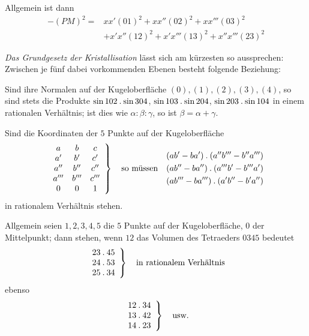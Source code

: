 Allgemein ist dann
\[
\begin{aligned}
-(PM)^2={}&xx'(01)^2+xx''(02)^2+xx'''(03)^2\\
&+x'x''(12)^2+x'x'''(13)^2+x''x'''(23)^2
\end{aligned}
\]

\emph{Das Grundgesetz der Kristallisation} lässt sich am kürzesten so aussprechen: Zwischen je fünf dabei vorkommenden Ebenen besteht folgende Beziehung:

Sind ihre Normalen auf der Kugeloberfläche $(0),(1),(2),(3),(4)$, so sind stets die Produkte $\sin102\mathbin{.}\sin304$, $\sin103\mathbin{.}\sin204$, $\sin203\mathbin{.}\sin104$ in einem rationalen Verhältnis; ist dies wie $\alpha:\beta:\gamma$, so ist $\beta=\alpha+\gamma$.

Sind die Koordinaten der $5$ Punkte auf der Kugeloberfläche
\[
\left.\begin{array}{ccc}
a&b&c\\a'&b'&c'\\a''&b''&c''\\a'''&b'''&c'''\\0&0&1
\end{array}\right\}
\quad\text{so müssen}\quad
\begin{gathered}
(ab'-ba')\mathbin{.}(a''b'''-b''a''')\\
(ab''-ba'')\mathbin{.}(a'''b'-b'''a')\\
(ab'''-ba''')\mathbin{.}(a'b''-b'a'')
\end{gathered}
\]
in rationalem Verhältnis stehen.

Allgemein seien $1,2,3,4,5$ die $5$ Punkte auf der Kugeloberfläche, $0$ der Mittelpunkt; dann stehen, wenn $12$ das Volumen des Tetraeders $0345$ bedeutet
\[
\left.\begin{array}{c}23\mathbin{.}45\\24\mathbin{.}53\\25\mathbin{.}34\end{array}\right\}
\quad\text{in rationalem Verhältnis}
\]
ebenso
\[
\left.\begin{array}{c}12\mathbin{.}34\\13\mathbin{.}42\\14\mathbin{.}23\end{array}\right\}\quad\text{usw.}
\]

